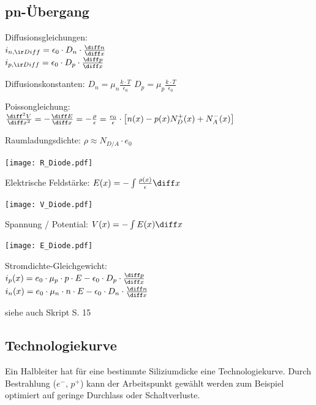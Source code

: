 \documentclass[german]{latex4ei_fs}
\begin{document}
\begin{sectionbox}

\subsection{pn-Übergang}

Diffusionsgleichungen: \\
$i_{n, \ir Diff} = \epsilon_0 \cdot D_n \cdot \frac{\diff n}{\diff x}$\\
$i_{p, \ir Diff} = \epsilon_0 \cdot D_p \cdot \frac{\diff p}{\diff x}$

Diffusionskonstanten: 
$D_n = \mu_n \frac{k \cdot T}{\epsilon_0}$ \quad $D_p = \mu_p \frac{k \cdot T}{\epsilon_0}$

Poissongleichung: \\
 $\frac{\diff^2 V}{\diff x^2} = - \frac{\diff E}{\diff x} = - \frac{\rho}{\epsilon} = \frac{e_0}{\epsilon} \cdot \left[ n(x) - p(x)  N_D^+ (x) + N_A^- (x) \right]$

Raumladungsdichte: $\rho \approx N_{D/A} \cdot e_0$

\texttt{[image: R\_Diode.pdf]}


 Elektrische Feldstärke: $E(x) = - \int \frac{\rho (x)}{\epsilon} \diff x$

\texttt{[image: V\_Diode.pdf]}

 Spannung / Potential: $V(x) = - \int E(x) \diff x$

\texttt{[image: E\_Diode.pdf]}

 Stromdichte-Gleichgewicht: \\
 $i_p (x) = e_0 \cdot \mu_p \cdot p \cdot E - \epsilon_0 \cdot D_p \cdot \frac{\diff p}{\diff x}$ \\
  $i_n (x) = e_0 \cdot \mu_n \cdot n \cdot E - \epsilon_0 \cdot D_n \cdot \frac{\diff n}{\diff x}$

  siehe auch Skript S. 15
\end{sectionbox}

\begin{sectionbox}
\subsection{Technologiekurve}

Ein Halbleiter hat für eine bestimmte Siliziumdicke eine Technologiekurve. Durch Bestrahlung ($e^-$, $p^+$) kann der Arbeitspunkt gewählt werden zum Beispiel optimiert auf geringe Durchlass oder Schaltverluste.
\end{sectionbox}
\end{document}
